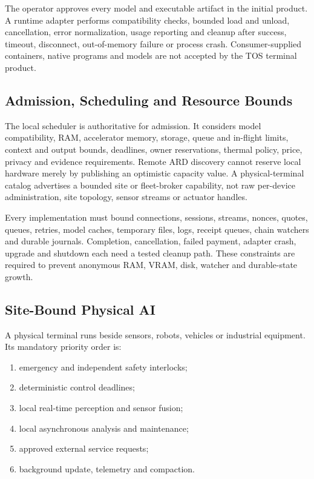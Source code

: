 \documentclass[11pt,oneside]{article}
\begin{document}
The operator approves every model and executable artifact in the initial product. A runtime
adapter performs compatibility checks, bounded load and unload, cancellation, error
normalization, usage reporting and cleanup after success, timeout, disconnect, out-of-memory
failure or process crash. Consumer-supplied containers, native programs and models are not
accepted by the TOS terminal product.

\subsection{Admission, Scheduling and Resource Bounds}

The local scheduler is authoritative for admission. It considers model compatibility, RAM,
accelerator memory, storage, queue and in-flight limits, context and output bounds, deadlines,
owner reservations, thermal policy, price, privacy and evidence requirements. Remote ARD
discovery cannot reserve local hardware merely by publishing an optimistic capacity value.
A physical-terminal catalog advertises a bounded site or fleet-broker capability, not raw
per-device administration, site topology, sensor streams or actuator handles.

Every implementation must bound connections, sessions, streams, nonces, quotes, queues,
retries, model caches, temporary files, logs, receipt queues, chain watchers and durable
journals. Completion, cancellation, failed payment, adapter crash, upgrade and shutdown each
need a tested cleanup path. These constraints are required to prevent anonymous RAM, VRAM,
disk, watcher and durable-state growth.

\subsection{Site-Bound Physical AI}

A physical terminal runs beside sensors, robots, vehicles or industrial equipment. Its
mandatory priority order is:

\begin{enumerate}
  \item emergency and independent safety interlocks;
  \item deterministic control deadlines;
  \item local real-time perception and sensor fusion;
  \item local asynchronous analysis and maintenance;
  \item approved external service requests;
  \item background update, telemetry and compaction.
\end{enumerate}
\end{document}
